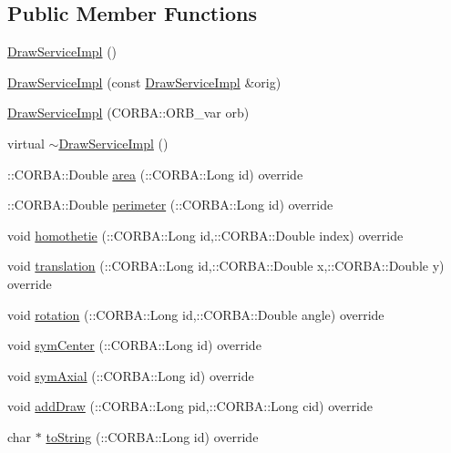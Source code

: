 \subsection*{Public Member Functions}
\begin{DoxyCompactItemize}
\item 
\hyperlink{class_draw_service_impl_a87d912a8f00ffa723cb8f53431f5266b}{Draw\+Service\+Impl} ()
\item 
\hyperlink{class_draw_service_impl_aba8a8c89630f768c86934aa551bd7632}{Draw\+Service\+Impl} (const \hyperlink{class_draw_service_impl}{Draw\+Service\+Impl} \&orig)
\item 
\hyperlink{class_draw_service_impl_a91a0c11ba71dac862ba24a1152046ef9}{Draw\+Service\+Impl} (C\+O\+R\+B\+A\+::\+O\+R\+B\+\_\+var orb)
\item 
virtual \hyperlink{class_draw_service_impl_a0ed99cbf8486cbbab8061728d005dd8a}{$\sim$\+Draw\+Service\+Impl} ()
\item 
\+::C\+O\+R\+B\+A\+::\+Double \hyperlink{class_draw_service_impl_af7c453d679b203736a8b46ccbf011205}{area} (\+::C\+O\+R\+B\+A\+::\+Long id) override
\item 
\+::C\+O\+R\+B\+A\+::\+Double \hyperlink{class_draw_service_impl_a48036a5f8d3cea2fcd81bf1c36581d3b}{perimeter} (\+::C\+O\+R\+B\+A\+::\+Long id) override
\item 
void \hyperlink{class_draw_service_impl_a2ded991472f1d2e1afab3a475360e070}{homothetie} (\+::C\+O\+R\+B\+A\+::\+Long id,\+::C\+O\+R\+B\+A\+::\+Double index) override
\item 
void \hyperlink{class_draw_service_impl_a0b11a8d94d84c97a00de63873370e932}{translation} (\+::C\+O\+R\+B\+A\+::\+Long id,\+::C\+O\+R\+B\+A\+::\+Double x,\+::C\+O\+R\+B\+A\+::\+Double y) override
\item 
void \hyperlink{class_draw_service_impl_a01fab41862413e70cd171883c36056a7}{rotation} (\+::C\+O\+R\+B\+A\+::\+Long id,\+::C\+O\+R\+B\+A\+::\+Double angle) override
\item 
void \hyperlink{class_draw_service_impl_a6d464f4798e45309ce29c69a60a04d2d}{sym\+Center} (\+::C\+O\+R\+B\+A\+::\+Long id) override
\item 
void \hyperlink{class_draw_service_impl_aa2aa750626c52f3e00056216e854e09e}{sym\+Axial} (\+::C\+O\+R\+B\+A\+::\+Long id) override
\item 
void \hyperlink{class_draw_service_impl_a9e4fe6a245439b112c5985682d759fb2}{add\+Draw} (\+::C\+O\+R\+B\+A\+::\+Long pid,\+::C\+O\+R\+B\+A\+::\+Long cid) override
\item 
char $\ast$ \hyperlink{class_draw_service_impl_a5cc444981cf134ad07a4c0e468883676}{to\+String} (\+::C\+O\+R\+B\+A\+::\+Long id) override
\end{DoxyCompactItemize}


